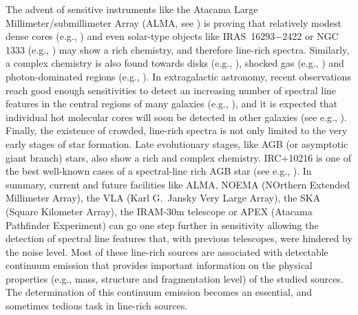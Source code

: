 \documentclass{aa}
\begin{document}
The advent of sensitive instruments like the Atacama Large Millimeter/submillimeter Array (ALMA, see \citealt{ALMA2015}) is proving that relatively modest dense cores (e.g., \citealt{SanchezMonge2013b, SanchezMonge2014, Beltran2014}) and even solar-type objects like IRAS~16293$-$2422 or NGC\,1333 (e.g., \citealt{Cazaux2003, Bottinelli2004, Jorgensen2016}) may show a rich chemistry, and therefore line-rich spectra. Similarly, a complex chemistry is also found towards disks (e.g., \citealt{Oberg2015, Guzman2015}), shocked gas (e.g., \citealt{Codella2010, Sugimura2011}) and photon-dominated regions (e.g., \citealt{TrevinoMorales2014, TrevinoMorales2016, Nagy2017}). In extragalactic astronomy, recent observations reach good enough sensitivities to detect an increasing number of spectral line features in the central regions of many galaxies (e.g., \citealt{GonzalezAlfonso2004, Martin2006, Martin2011, Aladro2011, Rangwala2011, Muller2011, Muller2014, Meier2015}), and it is expected that individual hot molecular cores will soon be detected in other galaxies (see e.g., \citealt{Shimonishi2016}). Finally, the existence of crowded, line-rich spectra is not only limited to the very early stages of star formation. Late evolutionary stages, like AGB (or asymptotic giant branch) stars, also show a rich and complex chemistry. IRC+10216 is one of the best well-known cases of a spectral-line rich AGB star (see e.g., \citealt{Cernicharo2000, Patel2011}).
In summary, current and future facilities like ALMA, NOEMA (NOrthern Extended Millimeter Array), the VLA (Karl G.\ Jansky Very Large Array), the SKA (Square Kilometer Array), the IRAM-30m telescope or APEX (Atacama Pathfinder Experiment) can go one step further in sensitivity allowing the detection of spectral line features that, with previous telescopes, were hindered by the noise level. Most of these line-rich sources are associated with detectable continuum emission that provides important information on the physical properties (e.g., mass, structure and fragmentation level) of the studied sources. The determination of this continuum emission becomes an essential, and sometimes tedious task in line-rich sources.
\end{document}
